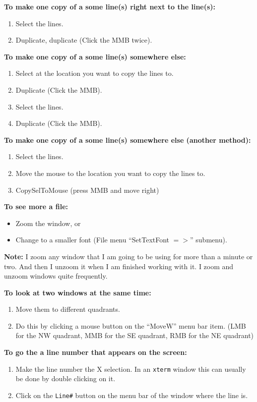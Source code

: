{\bf To make one copy of a some line(s) right next to the line(s):}
\begin{enumerate}
\item Select the lines.
\item Duplicate, duplicate (Click the MMB twice).
\end{enumerate}

{\bf To make one copy of a some line(s) somewhere else:}
\begin{enumerate}
\item Select at the location you want to copy the lines to.
\item Duplicate (Click the MMB).
\item Select the lines.
\item Duplicate (Click the MMB).
\end{enumerate}

{\bf To make one copy of a some line(s) somewhere else (another method):}
\begin{enumerate}
\item Select the lines.
\item Move the mouse to the location you want to copy the lines to.
\item CopySelToMouse (press MMB and move right)
\end{enumerate}

{\bf To see more a file:}
\begin{itemize}
\item Zoom the window, or
\item Change to a smaller font (File menu ``SetTextFont $=>$'' submenu).
\end{itemize}

{\bf Note:} I zoom any window that I am going to be using for more than
a minute or two.
And then I unzoom it when I am finished working with it.
I zoom and unzoom windows quite frequently.

{\bf To look at two windows at the same time:}
\begin{enumerate}
\item Move them to different quadrants.
\item Do this by clicking a mouse button on the ``MoveW'' menu bar item.
(LMB for the NW quadrant, MMB for the SE quadrant, RMB for the NE quadrant)
\end{enumerate}

{\bf To go the a line number that appears on the screen:}
\begin{enumerate}
\item Make the line number the X selection.
In an {\tt xterm} window this can usually be done by double clicking on it.
\item Click on the {\tt Line\#} button on the menu bar of the window
where the line is.
\end{enumerate}

